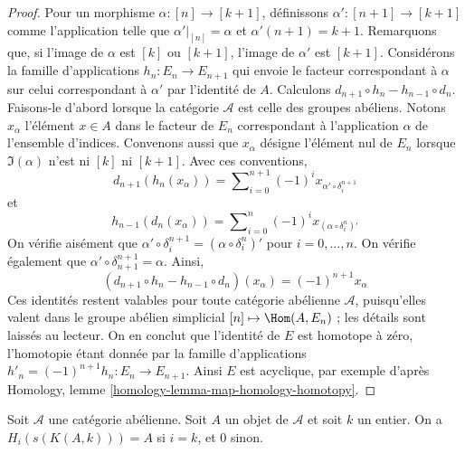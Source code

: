 \begin{proof}
Pour un morphisme $\alpha : [n] \to [k + 1]$, définissons
$\alpha' : [n + 1] \to [k + 1]$ comme l'application telle que
$\alpha'|_{[n]} = \alpha$ et $\alpha'(n + 1) = k + 1$. Remarquons que,
si l'image de $\alpha$ est $[k]$ ou $[k + 1]$, l'image de $\alpha'$ est
$[k + 1]$. Considérons la famille d'applications
$h_n : E_n \to E_{n + 1}$ qui envoie le facteur correspondant à $\alpha$
sur celui correspondant à $\alpha'$ par l'identité de $A$. Calculons
$d_{n + 1} \circ h_n - h_{n - 1} \circ d_n$. Faisons-le d'abord lorsque
la catégorie $\mathcal{A}$ est celle des groupes abéliens. Notons
$x_\alpha$ l'élément $x \in A$ dans le facteur de $E_n$ correspondant à
l'application $\alpha$ de l'ensemble d'indices. Convenons aussi que
$x_\alpha$ désigne l'élément nul de $E_n$ lorsque $\Im(\alpha)$ n'est ni
$[k]$ ni $[k + 1]$. Avec ces conventions,
$$
d_{n + 1}(h_n(x_\alpha)) =
\sum\nolimits_{i = 0}^{n + 1} (-1)^i x_{\alpha' \circ \delta^{n + 1}_i}
$$
et
$$
h_{n - 1}(d_n(x_\alpha)) =
\sum\nolimits_{i = 0}^n (-1)^i x_{(\alpha \circ \delta_i^n)'}
$$
On vérifie aisément que
$\alpha' \circ \delta^{n + 1}_i = (\alpha \circ \delta_i^n)'$
pour $i = 0, \ldots, n$. On vérifie également que
$\alpha' \circ \delta^{n + 1}_{n + 1} = \alpha$. Ainsi,
$$
(d_{n + 1} \circ h_n - h_{n - 1} \circ d_n)(x_\alpha)
=
(-1)^{n + 1} x_\alpha
$$
Ces identités restent valables pour toute catégorie abélienne
$\mathcal{A}$, puisqu'elles valent dans le groupe abélien simplicial
$[n] \mapsto \Hom(A, E_n)$ ; les détails sont laissés au lecteur.
On en conclut que l'identité de $E$ est homotope à zéro, l'homotopie étant
donnée par la famille d'applications
$h'_n = (-1)^{n + 1}h_n : E_n \to E_{n + 1}$. Ainsi $E$ est acyclique,
par exemple d'après Homology, lemme
\ref{homology-lemma-map-homology-homotopy}.
\end{proof}

\begin{lemma}
\label{lemma-homology-eilenberg-maclane}
Soit $\mathcal{A}$ une catégorie abélienne. Soit $A$ un objet de
$\mathcal{A}$ et soit $k$ un entier. On a
$H_i(s(K(A, k))) = A$ si $i = k$, et $0$ sinon.
\end{lemma}

